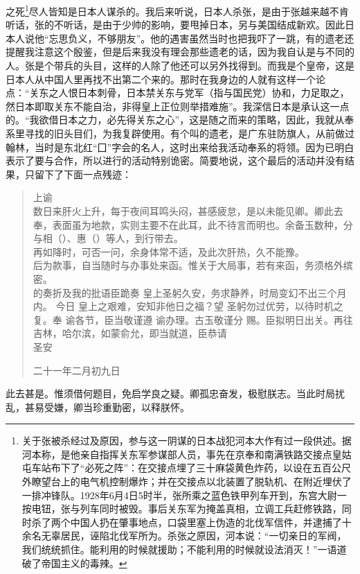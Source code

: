 之死\footnote{关于张被杀经过及原因，参与这一阴谋的日本战犯河本大作有过一段供述。据河本称，是他亲自指挥关东军参谋部人员，事先在京奉和南满铁路交接点皇姑屯车站布下了“必死之阵”：在交接点埋了三十麻袋黄色炸药，以设在五百公尺外瞭望台上的电气机控制爆炸；并在交接点以北装置了脱轨机、在附近埋伏了一排冲锋队。1928年6月4日5时半，张所乘之蓝色铁甲列车开到，东宫大尉一按电钮，张与列车同时被毁。事后关东军为掩盖真相，立调工兵赶修铁路，同时杀了两个中国人扔在肇事地点，口袋里塞上伪造的北伐军信件，并逮捕了十余名无辜居民，诬陷北伐军所为。杀张之原因，河本说：“一切亲日的军阀，我们统统抓住。能利用的时候就援助；不能利用的时候就设法消灭！”一语道破了帝国主义的毒辣。}尽人皆知是日本人谋杀的。我后来听说，日本人杀张，是由于张越来越不肯听话，张的不听话，是由于少帅的影响，要甩掉日本，另与美国结成新欢。因此日本人说他“忘思负义，不够朋友”。他的遇害虽然当时也把我吓了一跳，有的遗老还提醒我注意这个殷鉴，但是后来我没有理会那些遗老的话，因为我自认是与不同的人。张是个带兵的头目，这样的人除了他还可以另外找得到。而我是个皇帝，这是日本人从中国人里再找不出第二个来的。那时在我身边的人就有这样一个论点：“关东之人恨日本刺骨，日本禁关东与党军（指与国民党）协和，力足取之，然日本即取关东不能自治，非得皇上正位则举措难施”。我深信日本是承认这一点的。“我欲借日本之力，必先得关东之心”，这是随之而来的策略，因此，我就从奉系里寻找的旧头目们，为我复辟使用。有个叫的遗老，是广东驻防旗人，从前做过翰林，当时是东北红“囗”字会的名人，这时出来给我活动奉系的将领。因为已明白表示了要与合作，所以进行的活动特别诡密。简要地说，这个最后的活动并没有结果，只留下了下面一点残迹：\\

\begin{quote}
	上谕\\

数日来肝火上升，每于夜间耳鸣头闷，甚感疲怠，是以未能见卿。卿此去奉，表面虽为地款，实则主要不在此耳，此不待言而明也。余备玉数种，分与相（）、惠（）等人，到行带去。\\

再如降时，可否一问，余身体常不适，及此次肝热，久不能豫。\\

后为款事，自当随时与办事处来函。惟关于大局事，若有来函，务须格外缤密。\\

的奏折及我的批语臣跪奏  皇上圣躬久安，务求静养，时局变幻不出三个月内。  今日  皇上之艰难，安知非他日之福？望  圣躬勿过优劳，以待时机之复。奉  谕各节，臣当敬谨遵  谕办理。古玉敬谨分  赐。臣拟明日出关。再往吉林，哈尔滨，如蒙俞允，即当就道，臣恭请\\

圣安\\

\begin{flushright}
	二十一年二月初九日\\
\end{flushright}
\end{quote}

此去甚是。惟须借何题目，免启学良之疑。卿孤忠奋发，极慰朕志。当此时局扰乱，甚易受嫌，卿当珍重勤密，以释朕怀。
